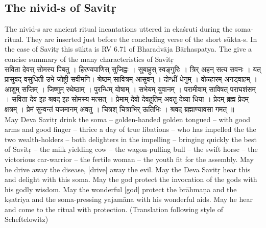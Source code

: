 \documentclass[12pt]{article}
\begin{document}
\subsection{The nivid-s of Savitṛ} 
The nivid-s are ancient ritual incantations uttered in ekaśruti during the soma-ritual. They are inserted just before the concluding verse of the short sūkta-s. In the case of Savitṛ this sūkta is RV 6.71 of Bharadvāja Bārhaspatya. The give a concise summary of the many characteristics of Savitṛ\\[8pt]
{\skt सविता देवस् सोमस्य पिबतु । हिरण्यपाणिस् सुजिह्वः । सुबाहुस् स्वङ्गुरिः । त्रिर् अहन् सत्य सवनः । यत् प्रासुवद् वसुधिती उभे जोष्ट्री सवीमनि। श्रेष्ठम् सावित्रम् आसुवन् । दोग्ध्रीं धेनुम् । वोळ्हारम् अनड्वाहम् । आशुम् सप्तिम् । जिष्णुम् रथेष्ठाम् । पुरन्धिम् योषाम् । सभेयम् युवानम् । परामीवाम् साविषत् पराघशंसम् । सविता देव इह श्रवद् इह सोमस्य मत्सत् । प्रेमाम् देवो देवहूतिम् अवतु देव्या धिया । प्रेदम् ब्रह्म प्रेदम् क्षत्रम् । प्रेमं सुन्वन्तं यजमानम् अवतु । चित्रश् चित्राभिर् ऊतिभिः । श्रवद् ब्रह्माण्यावसा गमत् ॥
}\\[8pt]
May Deva Savitṛ drink the soma -- golden-handed golden tongued -- with good arms and good finger -- thrice a day of true libations -- who has impelled the the two wealth-holders -- both delighters in the impelling -- bringing quickly the best of Savitṛ -- the milk yielding cow -- the wagon-pulling bull -- the swift horse -- the victorious car-warrior -- the fertile woman -- the youth fit for the assembly. May he drive away the disease, [drive] away the evil. May the Deva Savitṛ hear this and delight with this soma. May the god protect the invocation of the gods with his godly wisdom. May the wonderful [god]  protect the brāhmaṇa and the kṣatriya and the soma-pressing yajamāna with his wonderful aids. May he hear and come to the ritual with protection. (Translation following style of Scheftelowitz)
 
\end{document}
